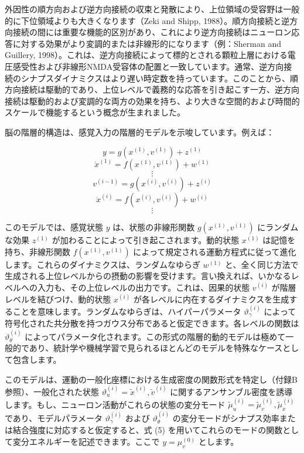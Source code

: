 \documentclass{article}
\begin{document}
外因性の順方向および逆方向接続の収束と発散により、上位領域の受容野は一般的に下位領域よりも大きくなります（Zeki and Shipp, 1988）。順方向接続と逆方向接続の間には重要な機能的区別があり、これにより逆方向接続はニューロン応答に対する効果がより変調的または非線形的になります（例：Sherman and Guillery, 1998）。これは、逆方向接続によって標的とされる顆粒上層における電圧感受性および非線形NMDA受容体の配置と一致しています。通常、逆方向接続のシナプスダイナミクスはより遅い時定数を持っています。このことから、順方向接続は駆動的であり、上位レベルで義務的な応答を引き起こす一方、逆方向接続は駆動的および変調的な両方の効果を持ち、より大きな空間的および時間的スケールで機能するという概念が生まれました。

脳の階層的構造は、感覚入力の階層的モデルを示唆しています。例えば：

$$y=g(x^{(1)},v^{(1)})+z^{(1)}$$$$\dot{x}^{(1)}=f(x^{(1)},v^{(1)})+w^{(1)}$$$$\vdots$$$$v^{(i-1)}=g(x^{(i)},v^{(i)})+z^{(i)}$$$$\dot{x}^{(i)}=f(x^{(i)},v^{(i)})+w^{(i)}$$
$$\vdots$$

このモデルでは、感覚状態 $y$ は、状態の非線形関数 $g(x^{(1)},v^{(1)})$ にランダムな効果 $z^{(1)}$ が加わることによって引き起こされます。動的状態 $x^{(1)}$ は記憶を持ち、非線形関数 $f(x^{(1)},v^{(1)})$ によって規定される運動方程式に従って進化します。これらのダイナミクスは、ランダムなゆらぎ $w^{(1)}$ と、全く同じ方法で生成される上位レベルからの摂動の影響を受けます。言い換えれば、いかなるレベルへの入力も、その上位レベルの出力です。これは、因果的状態 $v^{(i)}$ が階層レベルを結びつけ、動的状態 $x^{(i)}$ が各レベルに内在するダイナミクスを生成することを意味します。ランダムなゆらぎは、ハイパーパラメータ $\vartheta^{(i)}_\gamma$ によって符号化された共分散を持つガウス分布であると仮定できます。各レベルの関数は $\vartheta^{(i)}_\theta$ によってパラメータ化されます。この形式の階層的動的モデルは極めて一般的であり、統計学や機械学習で見られるほとんどのモデルを特殊なケースとして包含します。

このモデルは、運動の一般化座標における生成密度の関数形式を特定し（付録B参照）、一般化された状態 $\vartheta^{(i)}_u=\tilde{x}^{(i)},\tilde{v}^{(i)}$ に関するアンサンブル密度を誘導します。もし、ニューロン活動がこれらの状態の変分モード $\tilde{\mu}^{(i)}_u=\tilde{\mu}^{(i)}_v,\tilde{\mu}^{(i)}_x$ であり、モデルパラメータ $\vartheta^{(i)}_\gamma$ および $\vartheta^{(i)}_\theta$ の変分モードがシナプス効率または結合強度に対応すると仮定すると、式 (5) を用いてこれらのモードの関数として変分エネルギーを記述できます。ここで $y=\mu^{(0)}_v$ とします。
\end{document}
